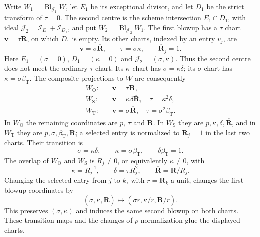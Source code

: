 \documentclass[11pt,a4paper]{article}
\numberwithin{equation}{section}
\theoremstyle{plain}
\theoremstyle{definition}
\theoremstyle{remark}
\begin{document}
Write $W_1=\operatorname{Bl}_{\mathcal J_1}W$, let $E_1$ be its
exceptional divisor, and let $D_1$ be the strict transform of $\tau=0$.
The second centre is the scheme intersection $E_1\cap D_1$, with ideal
$\mathcal J_2=\mathcal I_{E_1}+\mathcal I_{D_1}$, and put
$W_2=\operatorname{Bl}_{\mathcal J_2}W_1$.
The first blowup has a $\tau$ chart
$\boldsymbol v=\tau\boldsymbol R$, on which $D_1$ is empty.
Its other charts, indexed by an entry $v_j$, are
\[
 \boldsymbol v=\sigma\overline{\boldsymbol R},\qquad
 \tau=\sigma\kappa,\qquad \overline{\boldsymbol R}_j=1.
\]
Here $E_1=(\sigma=0)$, $D_1=(\kappa=0)$ and
$\mathcal J_2=(\sigma,\kappa)$. Thus the second centre does not meet the
ordinary $\tau$ chart. Its $\kappa$ chart has
$\sigma=\kappa\delta$; its $\sigma$ chart has $\kappa=\sigma\beta_{\mathrm T}$.
The composite projections to $W$ are consequently
\begin{align*}
 W_{\mathrm O}:&\quad \boldsymbol v=\tau\boldsymbol R,\\
 W_{\mathrm S}:&\quad \boldsymbol v=\kappa\delta\overline{\boldsymbol R},
                 \quad\tau=\kappa^2\delta,\\
 W_{\mathrm T}:&\quad \boldsymbol v=\sigma\overline{\boldsymbol R},
                 \quad\tau=\sigma^2\beta_{\mathrm T}.
\end{align*}
In $W_{\mathrm O}$ the remaining coordinates are $\overline p$,
$\tau$ and $\boldsymbol R$. In $W_{\mathrm S}$ they are
$\overline p,\kappa,\delta,\overline{\boldsymbol R}$, and in
$W_{\mathrm T}$ they are $\overline p,\sigma,\beta_{\mathrm T},
\overline{\boldsymbol R}$; a selected entry is normalized to
$\overline{\boldsymbol R}_j=1$ in the last two charts.
Their transition is
\[
 \sigma=\kappa\delta,\qquad \kappa=\sigma\beta_{\mathrm T},
 \qquad\delta\beta_{\mathrm T}=1.
\]
The overlap of $W_{\mathrm O}$ and $W_{\mathrm S}$ is $R_j\ne0$,
or equivalently $\kappa\ne0$, with
\[
 \kappa=R_j^{-1},\qquad \delta=\tau R_j^2,\qquad
 \overline{\boldsymbol R}=\boldsymbol R/R_j.
\]
Changing the selected entry from $j$ to $k$, with
$r=\overline{\boldsymbol R}_k$ a unit, changes the first blowup coordinates by
\[
 (\sigma,\kappa,\overline{\boldsymbol R})
       \longmapsto(\sigma r,\kappa/r,\overline{\boldsymbol R}/r).
\]
This preserves $(\sigma,\kappa)$ and induces the same second blowup on
both charts. These transition maps and the changes of
$\overline p$ normalization glue the displayed charts.
\end{document}
